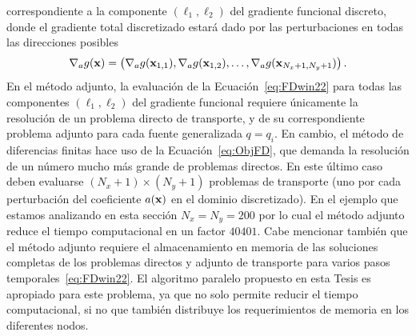 correspondiente a la componente $(\ell_1,\ell_2)$ del gradiente funcional discreto, 
donde el gradiente total discretizado estará dado por las perturbaciones en todas las direcciones posibles
\begin{equation}
\nabla_a g(\mathbf{x})  = \left( \nabla_a g(\mathbf{x}_{1,1}), \nabla_a g(\mathbf{x}_{1,2}), \ldots, \nabla_a g(\mathbf{x}_{N_x+1,N_y+1})   \right).
\label{eq:grad_total}
\end{equation}
En el método adjunto, la evaluación de la Ecuación~\eqref{eq:FDwin22} 
para todas las componentes $(\ell_1,\ell_2)$ del gradiente funcional requiere 
únicamente la resolución de un problema directo de transporte, y de 
su correspondiente problema adjunto para cada fuente  generalizada $q=q_i$. 
En cambio, el método de diferencias finitas hace uso de la Ecuación~\eqref{eq:ObjFD}, que demanda la resolución de 
un número mucho más grande de problemas directos. En este último caso  deben evaluarse $(N_x+1) \times (N_y+1)$ problemas de transporte (uno por cada perturbación del coeficiente $a(\mathbf{x})$ en el dominio discretizado). En el ejemplo que estamos analizando en esta sección $N_x=N_y=200$ por lo cual 
el método adjunto reduce el tiempo computacional 
en un factor $40401$.
Cabe mencionar también que el método adjunto requiere el almacenamiento 
en memoria de las soluciones completas de los problemas directos y adjunto de transporte 
para varios pasos temporales~\eqref{eq:FDwin22}. 
El algoritmo paralelo propuesto en esta Tesis es apropiado para este problema, ya que no solo permite 
reducir el tiempo computacional, si no que también distribuye los requerimientos de memoria en los diferentes nodos. 
 
